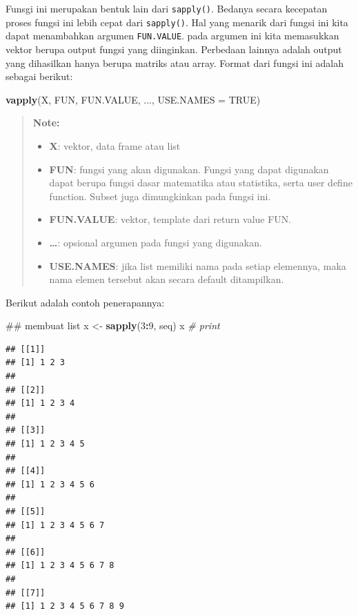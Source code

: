 \documentclass[]{book}
\newenvironment{Shaded}{\begin{snugshade}}{\end{snugshade}}
\newcommand{\KeywordTok}[1]{\textcolor[rgb]{0.13,0.29,0.53}{\textbf{#1}}}
\newcommand{\DataTypeTok}[1]{\textcolor[rgb]{0.13,0.29,0.53}{#1}}
\newcommand{\DecValTok}[1]{\textcolor[rgb]{0.00,0.00,0.81}{#1}}
\newcommand{\StringTok}[1]{\textcolor[rgb]{0.31,0.60,0.02}{#1}}
\newcommand{\CommentTok}[1]{\textcolor[rgb]{0.56,0.35,0.01}{\textit{#1}}}
\newcommand{\OtherTok}[1]{\textcolor[rgb]{0.56,0.35,0.01}{#1}}
\newcommand{\OperatorTok}[1]{\textcolor[rgb]{0.81,0.36,0.00}{\textbf{#1}}}
\newcommand{\NormalTok}[1]{#1}
\providecommand{\tightlist}{%
  \setlength{\itemsep}{0pt}\setlength{\parskip}{0pt}}
\begin{document}
Funsgi ini merupakan bentuk lain dari \texttt{sapply()}. Bedanya secara
kecepatan proses fungsi ini lebih cepat dari \texttt{sapply()}. Hal yang
menarik dari fungsi ini kita dapat menambahkan argumen
\texttt{FUN.VALUE}. pada argumen ini kita memasukkan vektor berupa
output fungsi yang diinginkan. Perbedaan lainnya adalah output yang
dihasilkan hanya berupa matriks atau array. Format dari fungsi ini
adalah sebagai berikut:

\begin{Shaded}
\begin{Highlighting}[]
\KeywordTok{vapply}\NormalTok{(X, FUN, FUN.VALUE, ..., }\DataTypeTok{USE.NAMES =} \OtherTok{TRUE}\NormalTok{)}
\end{Highlighting}
\end{Shaded}

\begin{quote}
\textbf{Note: }

\begin{itemize}
\tightlist
\item
  \textbf{X}: vektor, data frame atau list
\item
  \textbf{FUN}: fungsi yang akan digunakan. Fungsi yang dapat digunakan
  dapat berupa fungsi dasar matematika atau statistika, serta user
  define function. Subset juga dimungkinkan pada fungsi ini.
\item
  \textbf{FUN.VALUE}: vektor, template dari return value FUN.
\item
  \textbf{\ldots{}}: opsional argumen pada fungsi yang digunakan.
\item
  \textbf{USE.NAMES}: jika list memiliki nama pada setiap elemennya,
  maka nama elemen tersebut akan secara default ditampilkan.
\end{itemize}
\end{quote}

Berikut adalah contoh penerapannya:

\begin{Shaded}
\begin{Highlighting}[]
\NormalTok{## membuat list}
\NormalTok{x <-}\StringTok{ }\KeywordTok{sapply}\NormalTok{(}\DecValTok{3}\OperatorTok{:}\DecValTok{9}\NormalTok{, seq)}
\NormalTok{x }\CommentTok{# print}
\end{Highlighting}
\end{Shaded}

\begin{verbatim}
## [[1]]
## [1] 1 2 3
## 
## [[2]]
## [1] 1 2 3 4
## 
## [[3]]
## [1] 1 2 3 4 5
## 
## [[4]]
## [1] 1 2 3 4 5 6
## 
## [[5]]
## [1] 1 2 3 4 5 6 7
## 
## [[6]]
## [1] 1 2 3 4 5 6 7 8
## 
## [[7]]
## [1] 1 2 3 4 5 6 7 8 9
\end{verbatim}
\end{document}
